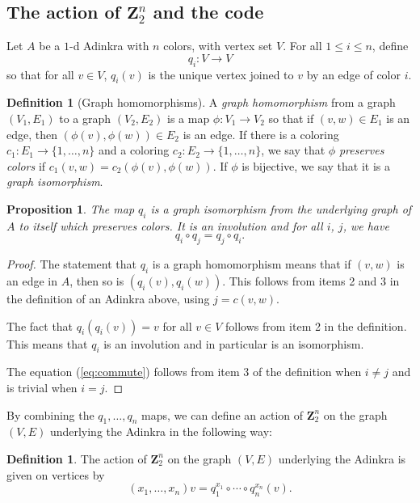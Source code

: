 \documentclass[12pt,twoside,singlespace]{article}
\numberwithin{equation}{section}
\newtheorem{prop}[equation]{Proposition}
\theoremstyle{definition}
\newtheorem{definition}[equation]{Definition}
\newcommand{\ZZ}{\mathbf{Z}}
\begin{document}
\subsection{The action of $\ZZ_2^n$ and the code}
Let $A$ be a $1$-d Adinkra with $n$ colors, with vertex set $V$.  For all $1\le i\le n$, define
\[q_i:V\to V\]
so that for all $v\in V$, $q_i(v)$ is the unique vertex joined to $v$ by an edge of color $i$.

\begin{definition}[Graph homomorphisms]
\label{defn:homomorphism}
A \emph{graph homomorphism} from a graph $(V_1,E_1)$ to a graph $(V_2,E_2)$ is a map $\phi:V_1\to V_2$ so that if $(v,w)\in E_1$ is an edge, then $(\phi(v),\phi(w))\in E_2$ is an edge.  If there is a coloring $c_1:E_1\to\{1,\ldots,n\}$ and a coloring $c_2:E_2\to\{1,\ldots,n\}$, we say that $\phi$ \emph{preserves colors} if $c_1(v,w)=c_2(\phi(v),\phi(w))$.  If $\phi$ is bijective, we say that it is a \emph{graph isomorphism}.
\end{definition}

\begin{prop}
\label{prop:qmap}
The map $q_i$ is a graph isomorphism from the underlying graph of $A$ to itself which preserves colors.  It is an involution and for all $i$, $j$, we have
\begin{equation}
q_i\circ q_j=q_j\circ q_i.\label{eq:commute}
\end{equation}
\end{prop}
\begin{proof}
The statement that $q_i$ is a graph homomorphism means that if $(v,w)$ is an edge in $A$, then so is $(q_i(v),q_i(w))$.  This follows from items 2 and 3 in the definition of an Adinkra above, using $j=c(v,w)$.

The fact that $q_i(q_i(v))=v$ for all $v\in V$ follows from item 2 in the definition.  This means that $q_i$ is an involution and in particular is an isomorphism.

The equation (\ref{eq:commute}) follows from item 3 of the definition when $i\not=j$ and is trivial when $i=j$.
\end{proof}

By combining the $q_1,\ldots, q_n$ maps, we can define an action of $\ZZ_2^n$ on the graph $(V,E)$ underlying the Adinkra in the following way:
\begin{definition}
The action of $\ZZ_2^n$ on the graph $(V,E)$ underlying the Adinkra is given on vertices by
\[(x_1,\ldots,x_n)v=q_1^{x_1}\circ\cdots\circ q_n^{x_n}(v).\]
\end{definition}
\end{document}
